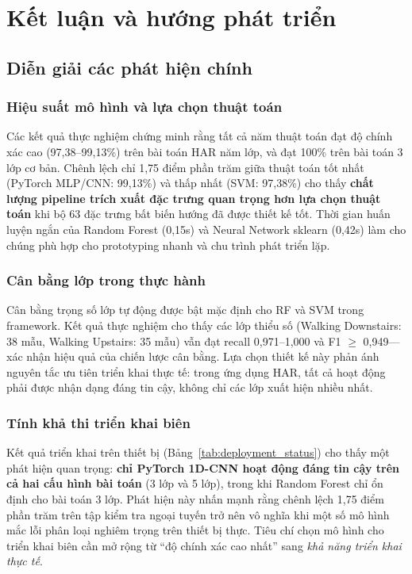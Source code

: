 \chapter{Kết luận và hướng phát triển}
\label{chap:discussion_conclusion}

\section{Diễn giải các phát hiện chính}

\subsection{Hiệu suất mô hình và lựa chọn thuật toán}
Các kết quả thực nghiệm chứng minh rằng tất cả năm thuật toán đạt độ chính xác cao (97,38--99,13\%) trên bài toán HAR năm lớp, và đạt 100\% trên bài toán 3 lớp cơ bản. Chênh lệch chỉ 1,75 điểm phần trăm giữa thuật toán tốt nhất (PyTorch MLP/CNN: 99,13\%) và thấp nhất (SVM: 97,38\%) cho thấy \textbf{chất lượng pipeline trích xuất đặc trưng quan trọng hơn lựa chọn thuật toán} khi bộ 63 đặc trưng bất biến hướng đã được thiết kế tốt. Thời gian huấn luyện ngắn của Random Forest (0,15s) và Neural Network sklearn (0,42s) làm cho chúng phù hợp cho prototyping nhanh và chu trình phát triển lặp.

\subsection{Cân bằng lớp trong thực hành}
Cân bằng trọng số lớp tự động được bật mặc định cho RF và SVM trong framework. Kết quả thực nghiệm cho thấy các lớp thiểu số (Walking Downstairs: 38 mẫu, Walking Upstairs: 35 mẫu) vẫn đạt recall 0,971--1,000 và F1 $\geq$ 0,949---xác nhận hiệu quả của chiến lược cân bằng. Lựa chọn thiết kế này phản ánh nguyên tắc ưu tiên triển khai thực tế: trong ứng dụng HAR, tất cả hoạt động phải được nhận dạng đáng tin cậy, không chỉ các lớp xuất hiện nhiều nhất.

\subsection{Tính khả thi triển khai biên}
Kết quả triển khai trên thiết bị (Bảng~\ref{tab:deployment_status}) cho thấy một phát hiện quan trọng: \textbf{chỉ PyTorch 1D-CNN hoạt động đáng tin cậy trên cả hai cấu hình bài toán} (3 lớp và 5 lớp), trong khi Random Forest chỉ ổn định cho bài toán 3 lớp. Phát hiện này nhấn mạnh rằng chênh lệch 1,75 điểm phần trăm trên tập kiểm tra ngoại tuyến trở nên vô nghĩa khi một số mô hình mắc lỗi phân loại nghiêm trọng trên thiết bị thực. Tiêu chí chọn mô hình cho triển khai biên cần mở rộng từ ``độ chính xác cao nhất'' sang \textit{khả năng triển khai thực tế}.

